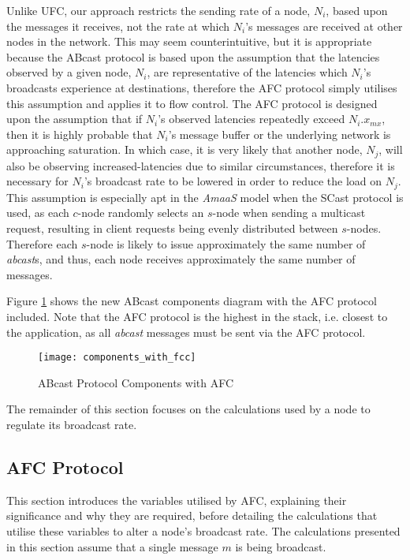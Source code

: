     Unlike \textsf{UFC}, our approach restricts the sending rate of a node, $N_i$, based upon the messages it receives, not the rate at which $N_i$'s messages are received at other nodes in the network.  This may seem counterintuitive, but it is appropriate because the \textsf{ABcast} protocol is based upon the assumption that the latencies observed by a given node, $N_i$, are representative of the latencies which $N_i$'s broadcasts experience at destinations, therefore the AFC protocol simply utilises this assumption and applies it to flow control.  The AFC protocol is designed upon the assumption that if $N_i$'s observed latencies repeatedly exceed $N_i.x_{mx}$, then it is highly probable that $N_i$'s message buffer or the underlying network is approaching saturation.  In which case, it is very likely that another node, $N_j$, will also be observing increased-latencies due to similar circumstances, therefore it is necessary for $N_i$'s broadcast rate to be lowered in order to reduce the load on $N_j$.  This assumption is especially apt in the \emph{AmaaS} model when the \textsf{SCast} protocol is used, as each $c$-node randomly selects an $s$-node when sending a multicast request, resulting in client requests being evenly distributed between $s$-nodes.  Therefore each $s$-node is likely to issue approximately the same number of \emph{abcast}s, and thus, each node receives approximately the same number of messages.          
    
    Figure \ref{fig:abcast_components_afc} shows the new \textsf{ABcast} components diagram with the AFC protocol included.  Note that the AFC protocol is the highest in the stack, i.e. closest to the application, as all \emph{abcast} messages must be sent via the AFC protocol.  
        
    \begin{figure}[!h] 
        \centering    
         \texttt{[image: components\_with\_fcc]}
         \caption[\textsf{ABcast} Protocol Components with AFC]{\textsf{ABcast} Protocol Components with AFC}
         \label{fig:abcast_components_afc}
    \end{figure}        
    
    The remainder of this section focuses on the calculations used by a node to regulate its broadcast rate.  
    
    \subsection{AFC Protocol}     
     This section introduces the variables utilised by AFC, explaining their significance and why they are required, before detailing the calculations that utilise these variables to alter a node's broadcast rate.  The calculations presented in this section assume that a single message $m$ is being broadcast.  
         
